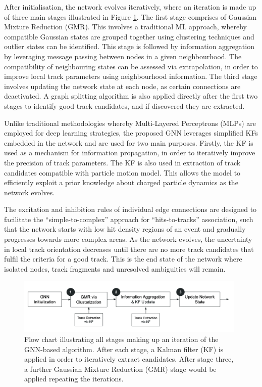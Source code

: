 After initialisation, the network evolves iteratively, where an iteration is made up of three main stages illustrated in Figure \ref{fig:flowchart}. The first stage comprises of Gaussian Mixture Reduction (GMR). This involves a traditional ML approach, whereby compatible Gaussian states are grouped together using clustering techniques and outlier states can be identified. This stage is followed by information aggregation by leveraging message passing between nodes in a given neighbourhood. The compatibility of neighbouring states can be assessed via extrapolation, in order to improve local track parameters using neighbourhood information. The third stage involves updating the network state at each node, as certain connections are deactivated. A graph splitting algorithm is also applied directly after the first two stages to identify good track candidates, and if discovered they are extracted. 

Unlike traditional methodologies whereby Multi-Layered Perceptrons (MLPs) are employed for deep learning strategies, the proposed GNN leverages simplified KFs embedded in the network and are used for two main purposes. Firstly, the KF is used as a mechanism for information propagation, in order to iteratively improve the precision of track parameters. The KF is also used in extraction of track candidates compatible with particle motion model. This allows the model to efficiently exploit a prior knowledge about charged particle dynamics as the network evolves.

The excitation and inhibition rules of individual edge connections are designed to facilitate the “simple-to-complex” approach for “hits-to-tracks” association, such that the network starts with low hit density regions of an event and gradually progresses towards more complex areas. As the network evolves, the uncertainty in local track orientation decreases until there are no more track candidates that fulfil the criteria for a good track. This is the end state of the network where isolated nodes, track fragments and unresolved ambiguities will remain.

\begin{figure}[htbp]
    \centering
    \includegraphics[width=0.98\textwidth]{images/5-gnn-algorithm/gnn-workflow.png}
    \caption{Flow chart illustrating all stages making up an iteration of the GNN-based algorithm. After each stage, a Kalman filter (KF) is applied in order to iteratively extract candidates. After stage three, a further Gaussian Mixture Reduction (GMR) stage would be applied repeating the iterations.}
    \label{fig:flowchart}%
\end{figure}



